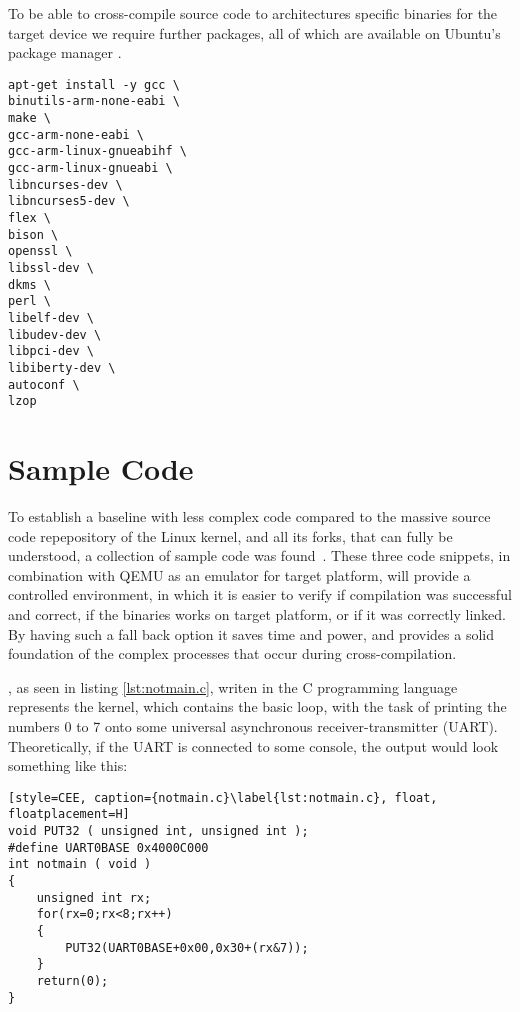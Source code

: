 To be able to cross-compile source code to architectures specific binaries for the target device we require further packages, all of which are available on Ubuntu's package manager .

\begin{lstlisting}[style=SH, caption=Installing toolchains and dependencies, label=toolchain-util, float, floatplacement=H]
apt-get install -y gcc \
binutils-arm-none-eabi \
make \
gcc-arm-none-eabi \
gcc-arm-linux-gnueabihf \
gcc-arm-linux-gnueabi \
libncurses-dev \
libncurses5-dev \
flex \
bison \
openssl \
libssl-dev \
dkms \
perl \
libelf-dev \
libudev-dev \
libpci-dev \
libiberty-dev \
autoconf \
lzop 
\end{lstlisting}

\section{Sample Code}

To establish a baseline with less complex code compared to the massive source code repepository of the Linux kernel, and all its forks, that can fully be understood, a collection of sample code was found~\cite{sample-code}. These three code snippets, in combination with QEMU as an emulator for target platform, will provide a controlled environment, in which it is easier to verify if compilation was successful and correct, if the binaries works on target platform, or if it was correctly linked. By having such a fall back option it saves  time and power, and provides a solid foundation of the complex processes that occur during cross-compilation. 

\code{notmain.c}, as seen in listing \ref{lst:notmain.c}, writen in the C programming language represents the kernel, which contains the basic loop, with the task of printing the numbers 0 to 7 onto some universal asynchronous receiver-transmitter (UART). Theoretically, if the UART is connected to some console, the output would look something like this:


\begin{lstlisting}[style=CEE, caption={notmain.c}\label{lst:notmain.c}, float, floatplacement=H]
void PUT32 ( unsigned int, unsigned int );
#define UART0BASE 0x4000C000
int notmain ( void )
{
    unsigned int rx;
    for(rx=0;rx<8;rx++)
    {
        PUT32(UART0BASE+0x00,0x30+(rx&7));
    }
    return(0);
}
\end{lstlisting}

